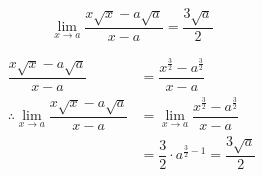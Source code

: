\documentclass[14pt,fleqn]{extarticle}
\begin{document}
 

\[ \lim_{x\to a} \dfrac{x\sqrt{x} - a\sqrt{a}}{x-a} = \dfrac{3\sqrt{a}}{2}\]

\newcard 

\begin{align}
\dfrac{x\sqrt{x} - a\sqrt{a}}{x-a} &= \dfrac{x^{\frac{3}{2}} - a^{\frac{3}{2}}}{x-a} \\
\therefore \lim_{x\to a} \dfrac{x\sqrt{x} - a\sqrt{a}}{x-a} &= \lim_{x\to a}\dfrac{x^{\frac{3}{2}} - a^{\frac{3}{2}}}{x-a} \\
&= \dfrac{3}{2}\cdot a^{\frac{3}{2}-1} = \dfrac{3\sqrt{a}}{2}
\end{align}
\end{document}

